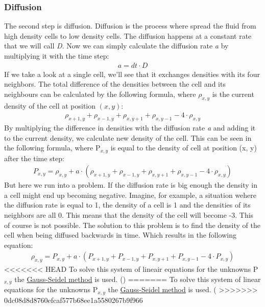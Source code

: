 \documentclass[a4paper,12pt]{article}
\begin{document}
\subsubsection{Diffusion}
The second step is diffusion.
Diffusion is the process where spread the fluid from high density cells to low density cells.
The diffusion happens at a constant rate that we will call \textit{D}. 
Now we can simply calculate the diffusion rate \textit{a} by multiplying it with the time step:
\[
\begin{array}{ll}
  a = dt \cdot D
\end{array}
\]
If we take a look at a single cell, we'll see that it exchanges densities with its four neighbors.
The total difference of the densities between the cell and its neighbours can be calculated by the following formula,
where $\rho_{x, y}$ is the current density of the cell at position $(x, y)$:
\[
\begin{array}{ll}
	\rho_{x+1, y} + \rho_{x-1, y} + \rho_{x, y+1} + \rho_{x, y-1} - 4 \cdot \rho_{x, y}
\end{array}
\]
By multiplying the difference in densities with the diffusion rate \textit{a} and adding it to the current density, we calculate new density of the cell. 
This can be seen in the following formula, where P$_{x, y}$ is equal to the density of cell at position (x, y) after the time step:
\[
\begin{array}{ll}
	P_{x, y} = \rho_{x, y} + a \cdot (\rho_{x+1, y} + \rho_{x-1, y} + \rho_{x, y+1} + \rho_{x, y-1} - 4 \cdot \rho_{x, y})
\end{array}
\]
But here we run into a problem. If the diffusion rate is big enough the density in a cell might end up becoming negative.
Imagine, for example, a situation wehere the diffusion rate is equal to 1,  the density of a cell is 1 and the densities of its neighbors are all 0. This means that the density of the cell will become -3.
This of course is not possible.
The solution to this problem is to find the density of the cell when being diffused backwards in time. Which results in the following equation:
\[
\begin{array}{ll}
	\rho_{x, y} = P_{x, y} + a \cdot (P_{x+1, y} + P_{x-1, y} + P_{x, y+1} + P_{x, y-1} - 4 \cdot P_{x, y})
\end{array}	
\]
<<<<<<< HEAD
To solve this system of lineair equations for the unknowns P$_{x, y}$ the \href{https://en.wikipedia.org/wiki/Gauss–Seidel_method}{Gauss-Seidel method} is used. 
(\cite{josstam})
=======
To solve this system of linear equations for the unknowns P$_{x, y}$ the \hyperlink{https://en.wikipedia.org/wiki/Gauss–Seidel_method}{Gauss-Seidel method} is used. 
(\cite{josstam}
>>>>>>> 0dc08d8d8760efcaf577b68ee1a5580267b9f966
\end{document}
